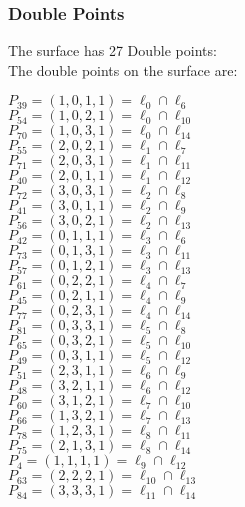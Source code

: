 \documentclass{article}
\begin{document}
{\subsubsection*{Double Points}
The surface has 27 Double points:\\
The double points on the surface are:\\
\begin{multicols}{2}
\noindent
$P_{39} = ( 1, 0, 1, 1 ) = \ell_{0} \cap \ell_{6} $\\
$P_{54} = ( 1, 0, 2, 1 ) = \ell_{0} \cap \ell_{10} $\\
$P_{70} = ( 1, 0, 3, 1 ) = \ell_{0} \cap \ell_{14} $\\
$P_{55} = ( 2, 0, 2, 1 ) = \ell_{1} \cap \ell_{7} $\\
$P_{71} = ( 2, 0, 3, 1 ) = \ell_{1} \cap \ell_{11} $\\
$P_{40} = ( 2, 0, 1, 1 ) = \ell_{1} \cap \ell_{12} $\\
$P_{72} = ( 3, 0, 3, 1 ) = \ell_{2} \cap \ell_{8} $\\
$P_{41} = ( 3, 0, 1, 1 ) = \ell_{2} \cap \ell_{9} $\\
$P_{56} = ( 3, 0, 2, 1 ) = \ell_{2} \cap \ell_{13} $\\
$P_{42} = ( 0, 1, 1, 1 ) = \ell_{3} \cap \ell_{6} $\\
$P_{73} = ( 0, 1, 3, 1 ) = \ell_{3} \cap \ell_{11} $\\
$P_{57} = ( 0, 1, 2, 1 ) = \ell_{3} \cap \ell_{13} $\\
$P_{61} = ( 0, 2, 2, 1 ) = \ell_{4} \cap \ell_{7} $\\
$P_{45} = ( 0, 2, 1, 1 ) = \ell_{4} \cap \ell_{9} $\\
$P_{77} = ( 0, 2, 3, 1 ) = \ell_{4} \cap \ell_{14} $\\
$P_{81} = ( 0, 3, 3, 1 ) = \ell_{5} \cap \ell_{8} $\\
$P_{65} = ( 0, 3, 2, 1 ) = \ell_{5} \cap \ell_{10} $\\
$P_{49} = ( 0, 3, 1, 1 ) = \ell_{5} \cap \ell_{12} $\\
$P_{51} = ( 2, 3, 1, 1 ) = \ell_{6} \cap \ell_{9} $\\
$P_{48} = ( 3, 2, 1, 1 ) = \ell_{6} \cap \ell_{12} $\\
$P_{60} = ( 3, 1, 2, 1 ) = \ell_{7} \cap \ell_{10} $\\
$P_{66} = ( 1, 3, 2, 1 ) = \ell_{7} \cap \ell_{13} $\\
$P_{78} = ( 1, 2, 3, 1 ) = \ell_{8} \cap \ell_{11} $\\
$P_{75} = ( 2, 1, 3, 1 ) = \ell_{8} \cap \ell_{14} $\\
$P_{4} = ( 1, 1, 1, 1 ) = \ell_{9} \cap \ell_{12} $\\
$P_{63} = ( 2, 2, 2, 1 ) = \ell_{10} \cap \ell_{13} $\\
$P_{84} = ( 3, 3, 3, 1 ) = \ell_{11} \cap \ell_{14} $\\
\end{multicols}
}
\end{document}

